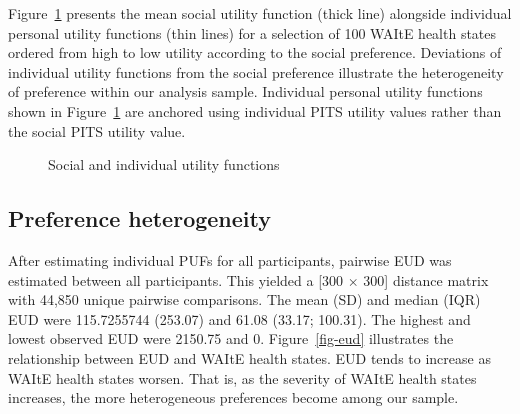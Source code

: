 \documentclass[
  letterpaper,
  DIV=11,
  numbers=noendperiod]{scrartcl}
\begin{document}
Figure~\ref{fig-sufplain} presents the mean social utility function
(thick line) alongside individual personal utility functions (thin
lines) for a selection of 100 WAItE health states ordered from high to
low utility according to the social preference. Deviations of individual
utility functions from the social preference illustrate the
heterogeneity of preference within our analysis sample. Individual
personal utility functions shown in Figure~\ref{fig-sufplain} are
anchored using individual PITS utility values rather than the social
PITS utility value.

\begin{figure}


\caption{\label{fig-sufplain}Social and individual utility functions}

\end{figure}%

\subsection{Preference heterogeneity}\label{preference-heterogeneity-1}

After estimating individual PUFs for all participants, pairwise EUD was
estimated between all participants. This yielded a {[}300 \(\times\)
300{]} distance matrix with 44,850 unique pairwise comparisons. The mean
(SD) and median (IQR) EUD were 115.7255744 (253.07) and 61.08 (33.17;
100.31). The highest and lowest observed EUD were 2150.75 and 0.
Figure~\ref{fig-eud} illustrates the relationship between EUD and WAItE
health states. EUD tends to increase as WAItE health states worsen. That
is, as the severity of WAItE health states increases, the more
heterogeneous preferences become among our sample.
\end{document}
